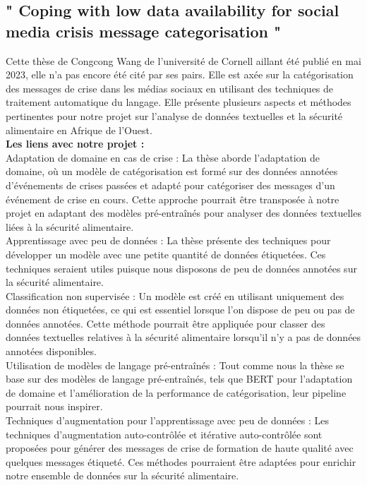 \documentclass{article}
\begin{document}
\subsection{" Coping with low data availability for social media crisis message categorisation "}

Cette thèse de Congcong Wang de l’université de Cornell aillant été publié en mai 2023, elle n’a pas encore été cité par ses pairs. Elle est axée sur la catégorisation des messages de crise dans les médias sociaux en utilisant des techniques de traitement automatique du langage. Elle présente plusieurs aspects et méthodes pertinentes pour notre projet sur l'analyse de données textuelles et la sécurité alimentaire en Afrique de l'Ouest. \\

\textbf{Les liens avec notre projet :} \\

Adaptation de domaine en cas de crise : La thèse aborde l'adaptation de domaine, où un modèle de catégorisation est formé sur des données annotées d'événements de crises passées et adapté pour catégoriser des messages d'un événement de crise en cours. Cette approche pourrait être transposée à notre projet en adaptant des modèles pré-entraînés pour analyser des données textuelles liées à la sécurité alimentaire. \\

Apprentissage avec peu de données : La thèse présente des techniques pour développer un modèle avec une petite quantité de données étiquetées. Ces techniques seraient utiles puisque nous disposons de peu de données annotées sur la sécurité alimentaire. \\

Classification non supervisée : Un modèle est créé en utilisant uniquement des données non étiquetées, ce qui est essentiel lorsque l'on dispose de peu ou pas de données annotées. Cette méthode pourrait être appliquée pour classer des données textuelles relatives à la sécurité alimentaire lorsqu'il n'y a pas de données annotées disponibles. \\

Utilisation de modèles de langage pré-entraînés : Tout comme nous la thèse se base sur des modèles de langage pré-entraînés, tels que BERT pour l'adaptation de domaine et l'amélioration de la performance de catégorisation, leur pipeline pourrait nous inspirer. \\

Techniques d'augmentation pour l'apprentissage avec peu de données : Les techniques d'augmentation auto-contrôlée et itérative auto-contrôlée sont proposées pour générer des messages de crise de formation de haute qualité avec quelques messages étiqueté. Ces méthodes pourraient être adaptées pour enrichir notre ensemble de données sur la sécurité alimentaire. \\
\end{document}
